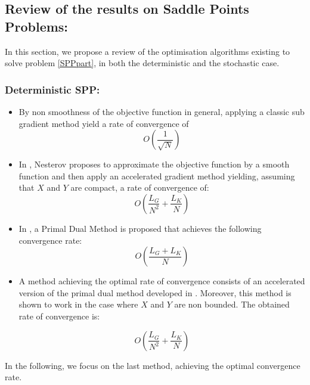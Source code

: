 \documentclass[12pt,reqno]{amsart}
\numberwithin{equation}{section}
\begin{document}
\subsection{ Review of the results on Saddle Points Problems: }


In this section, we propose a review of the optimisation algorithms existing to solve problem \ref{SPPpart}, in both the deterministic and the stochastic case.

\subsubsection{Deterministic SPP: }



\begin{itemize}

\item By non smoothness of the objective function in general, applying a classic sub gradient method \cite{YudinNemirovski} yield a rate of convergence of
$$
O(\dfrac{1}{\sqrt{N}})
$$

\item In \cite{Nesterov}, Nesterov proposes to approximate the objective function by a smooth function and then apply an accelerated gradient method yielding, assuming that $X$ and $Y$ are compact, a rate of convergence of:
$$
O(\dfrac{L_{G}}{N^2} + \dfrac{L_{K}}{N})
$$

\item In \cite{ChambollePock}, a Primal Dual Method is proposed that achieves the following convergence rate:
$$
O(\dfrac{L_{G} + L_{K}}{N})
$$
\item A method achieving the optimal rate of convergence consists of an accelerated version of the primal dual method developed in \cite{ChenLanOuyang}.
Moreover, this method is shown to work in the case where $X$ and $Y$ are non bounded.
The obtained rate of convergence is:

$$
O(\dfrac{L_{G}}{N^2} + \dfrac{L_{K}}{N})
$$


\end{itemize}

In the following, we focus on the last method, achieving the optimal convergence rate.

%
\end{document}
